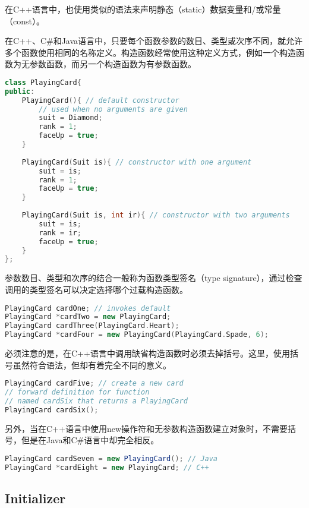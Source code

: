 在C++语言中，也使用类似的语法来声明静态（static）数据变量和/或常量（const）。

在C++、C\#和Java语言中，只要每个函数参数的数目、类型或次序不同，就允许多个函数使用相同的名称定义。构造函数经常使用这种定义方式，例如一个构造函数为无参数函数，而另一个构造函数为有参数函数。


\begin{lstlisting}[language=C++]
class PlayingCard{
public:
	PlayingCard(){ // default constructor
		// used when no arguments are given
		suit = Diamond;
		rank = 1;
		faceUp = true;
	}
	
	PlayingCard(Suit is){ // constructor with one argument
		suit = is;
		rank = 1;
		faceUp = true;
	}
	
	PlayingCard(Suit is, int ir){ // constructor with two arguments
		suit = is;
		rank = ir;
		faceUp = true;
	}
};
\end{lstlisting}


参数数目、类型和次序的结合一般称为函数类型签名（type signature），通过检查调用的类型签名可以决定选择哪个过载构造函数。


\begin{lstlisting}[language=C++]
PlayingCard cardOne; // invokes default
PlayingCard *cardTwo = new PlayingCard;
PlayingCard cardThree(PlayingCard.Heart);
PlayingCard *cardFour = new PlayingCard(PlayingCard.Spade, 6);
\end{lstlisting}

必须注意的是，在C++语言中调用缺省构造函数时必须去掉括号。这里，使用括号虽然符合语法，但却有着完全不同的意义。



\begin{lstlisting}[language=C++]
PlayingCard cardFive; // create a new card
// forward definition for function 
// named cardSix that returns a PlayingCard
PlayingCard cardSix(); 
\end{lstlisting}

另外，当在C++语言中使用new操作符和无参数构造函数建立对象时，不需要括号，但是在Java和C\#语言中却完全相反。


\begin{lstlisting}[language=Java]
PlayingCard cardSeven = new PlayingCard(); // Java
PlayingCard *cardEight = new PlayingCard; // C++
\end{lstlisting}


\subsection{Initializer}



